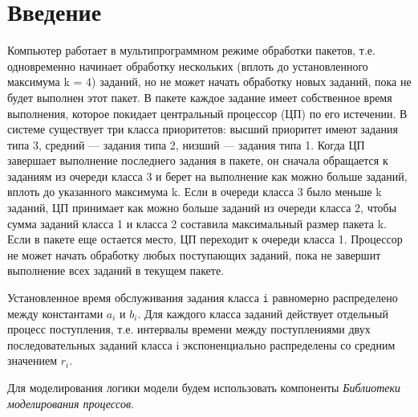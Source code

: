 \graphicspath{{./img}} %

\section*{\LARGE Введение}
Компьютер работает в мультипрограммном режиме
обработки пакетов, т.е. одновременно начинает обработку
нескольких (вплоть до установленного максимума k = 4)
заданий, но не может начать обработку новых заданий,
пока не будет выполнен этот пакет. В пакете каждое
задание имеет собственное время выполнения, которое
покидает центральный процессор (ЦП) по его истечении. В
системе существует три класса приоритетов: высший
приоритет имеют задания типа 3, средний --- задания типа
2, низший --- задания типа 1. Когда ЦП завершает
выполнение последнего задания в пакете, он сначала
обращается к заданиям из очереди класса 3 и берет на
выполнение как можно больше заданий, вплоть до
указанного максимума k. Если в очереди класса 3 было
меньше k заданий, ЦП принимает как можно больше
заданий из очереди класса 2, чтобы сумма заданий класса
1 и класса 2 составила максимальный размер пакета k. Если
в пакете еще остается место, ЦП переходит к очереди класса
1. Процессор не может начать обработку любых
поступающих заданий, пока не завершит выполнение всех
заданий в текущем пакете.\par
Установленное время обслуживания задания класса \texttt{i}
равномерно распределено между константами \(a_i\) и \(b_i\). Для
каждого класса заданий действует отдельный процесс
поступления, т.е. интервалы времени между поступлениями
двух последовательных заданий класса i экспоненциально
распределены со средним значением \(r_i\).\par
Для моделирования логики модели будем использовать
компоненты \textit{Библиотеки моделирования процессов}.

\clearpage

